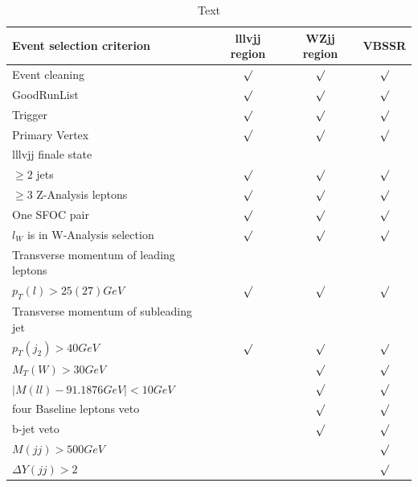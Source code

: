 \documentclass[../Bachelorarbeit.tex]{subfiles}
\begin{document}
\label{sec:Event_selection}
\begin{table}[h]
    \begin{tabular}{  l c c c }
        \hline
        Event selection criterion & lllvjj region & WZjj region & VBSSR\\
        \hline
        Event cleaning & $\surd$ & $\surd$ & $\surd$ \\
        GoodRunList & $\surd$ & $\surd$ & $\surd$ \\
        Trigger & $\surd$ & $\surd$ & $\surd$ \\
        Primary Vertex & $\surd$ & $\surd$ & $\surd$ \\
        \hline
        lllvjj finale state & & & \\
        \qquad $\geq 2$ jets & $\surd$ & $\surd$ & $\surd$ \\
        \qquad $\geq 3$ Z-Analysis leptons & $\surd$ & $\surd$ & $\surd$ \\
        \qquad One SFOC pair & $\surd$ & $\surd$ & $\surd$ \\
        $l_{W}$ is in W-Analysis selection & $\surd$ & $\surd$ & $\surd$ \\
        Transverse momentum of leading leptons & & & \\
        \qquad $p_{T}(l)>25(27) GeV$ & $\surd$ & $\surd$ & $\surd$ \\
        Transverse momentum of subleading jet & & & \\
        \qquad $p_{T}(j_{2})>40 GeV$ & $\surd$ & $\surd$ & $\surd$ \\
        \hline
        $M_{T}(W)>30 GeV$ & & $\surd$ & $\surd$ \\
        $\lvert M(ll)-91.1876 GeV\rvert < 10 GeV$ & & $\surd$ & $\surd$ \\
        four Baseline leptons veto & & $\surd$ & $\surd$ \\
        b-jet veto & & $\surd$ & $\surd$ \\
        \hline
        $M(jj)>500 GeV$ & & & $\surd$ \\
        $\Delta Y(jj) >2$ & & & $\surd$ \\
        \hline
    \end{tabular}
    \centering
    \caption{Text \cite{Bittrich.27.05.2020}}
    \label{tab:eventselection}
\end{table}
\end{document}
